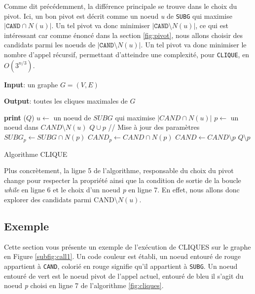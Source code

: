 \documentclass[12pt,a4paper]{article}
\begin{document}
Comme dit précédemment, la différence principale se trouve dans le choix du pivot. Ici, un bon pivot est décrit comme un noeud \emph{u} de \texttt{SUBG} qui maximise $ | \texttt{CAND} \cap N(u) |$. Un tel pivot va donc minimiser $ |\texttt{CAND} \setminus N(u)| $, ce qui est intéressant car comme énoncé dans la section \ref{fig:pivot}, nous allons choisir des candidats parmi les noeuds de $ |\texttt{CAND} \setminus N(u)| $. Un tel pivot va donc minimiser le nombre d'appel récursif, permettant d'atteindre une complexité, pour \texttt{CLIQUE}, en $ O(3^{n/3}) $\cite{CONTE20221}.

\begin{algorithm}[H]
  \textbf{Input}: un graphe $G = (V,E)$

  \textbf{Output}: toutes les cliques maximales de $G$
  \begin{algorithmic}[1]
       
        \State \textbf{print} ($ Q $)
      \Else
        \State $u \gets$ un noeud de $SUBG$ qui maximise $|CAND \cap N(u)|$
          \State $p \gets$ un noeud dans $CAND \setminus N(u)$
          \State $ Q \cup p $ 
          \State // Mise à jour des paramètres
          \State $SUBG_p \gets SUBG \cap N(p)$
          \State $CAND_p \gets CAND \cap N(p)$
          \State {}
          \State $CAND \gets CAND \setminus {p}$
          \State $ Q \setminus p $ 
        \EndWhile
      \EndIf
    \EndProcedure
    \State {}
  \end{algorithmic}
  \caption{\label{fig:cliques} Algorithme CLIQUE}
\end{algorithm}

Plus concrètement, la ligne 5 de l'algorithme, responsable du choix du pivot change pour respecter la propriété ainsi que la condition de sortie de la boucle \emph{while} en ligne 6 et le choix d'un noeud \emph{p} en ligne 7. En effet, nous allons donc explorer des candidats parmi \(\textrm{CAND} \setminus N(u)\).

\subsection{Exemple}%
\label{subsec:ex}

Cette section vous présente un exemple de l'exécution de CLIQUES sur le graphe en Figure \ref{subfig:call1}.
Un code couleur est établi, un noeud entouré de rouge appartient à \texttt{CAND}, colorié en rouge signifie qu'il appartient à \texttt{SUBG}. Un noeud entouré de vert est le noeud pivot de l'appel actuel, entouré de bleu il s'agit du noeud \emph{p} choisi en ligne 7 de l'algorithme \ref{fig:cliques}.
\end{document}
